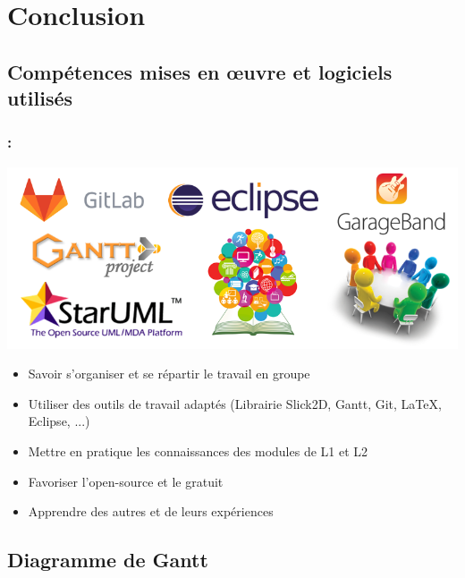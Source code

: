 \documentclass[9pt]{beamer}
\begin{document}
\section{Conclusion}

\subsection{Compétences mises en œuvre et logiciels utilisés}

\begin{frame}[fragile]
\frametitle{\insertsectionhead : \insertsubsectionhead}
\includegraphics[width=1\textwidth]{figures/conclu.png}
\begin{itemize}
    \item Savoir s'organiser et se répartir le travail en groupe
    \item Utiliser des outils de travail adaptés (Librairie Slick2D, Gantt, Git, \LaTeX, Eclipse, ...)
    \item Mettre en pratique les connaissances des modules de L1 et L2
    \item Favoriser l'open-source et le gratuit
    \item Apprendre des autres et de leurs expériences
\end{itemize}
\end{frame}

\subsection{Diagramme de Gantt}
\end{document}
